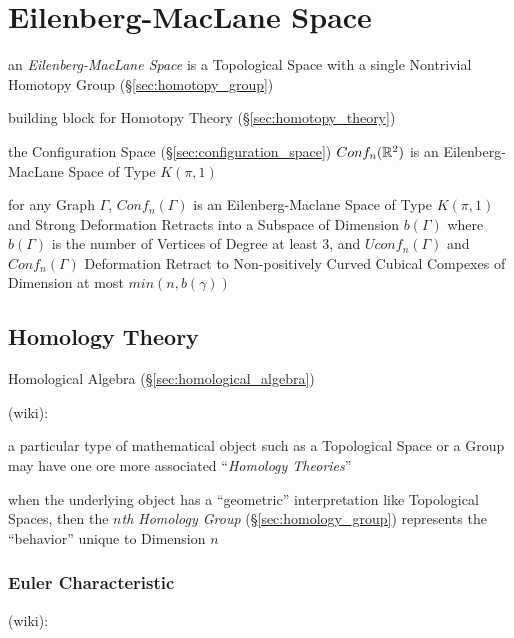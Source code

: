\section{Eilenberg-MacLane Space}\label{sec:eilenberg_maclane_space}

an \emph{Eilenberg-MacLane Space} is a Topological Space with a single
Nontrivial Homotopy Group (\S\ref{sec:homotopy_group})

building block for Homotopy Theory (\S\ref{sec:homotopy_theory})

the Configuration Space (\S\ref{sec:configuration_space}) $Conf_n(\mathbb{R}^2)$
is an Eilenberg-MacLane Space of Type $K(\pi,1)$

for any Graph $\Gamma$, $Conf_n(\Gamma)$ is an Eilenberg-Maclane Space of Type
$K(\pi,1)$ and Strong Deformation Retracts into a Subspace of Dimension
$b(\Gamma)$ where $b(\Gamma)$ is the number of Vertices of Degree at least 3,
and $Uconf_n(\Gamma)$ and $Conf_n(\Gamma)$ Deformation Retract to
Non-positively Curved Cubical Compexes of Dimension at most $min(n,b(\gamma))$



\subsection{Homology Theory}\label{sec:homology_theory}

\fist Homological Algebra (\S\ref{sec:homological_algebra})

(wiki):

a particular type of mathematical object such as a Topological Space or a
Group may have one ore more associated ``\emph{Homology Theories}''

when the underlying object has a ``geometric'' interpretation like Topological
Spaces, then the \emph{$n$th Homology Group} (\S\ref{sec:homology_group})
represents the ``behavior'' unique to Dimension $n$



\subsubsection{Euler Characteristic}\label{sec:euler_characteristic}

(wiki):

